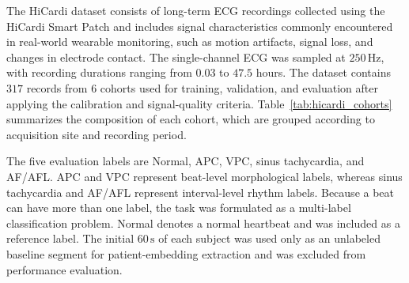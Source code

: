 \begin{table}[!ht]
\centering
\caption{Cohort composition of the HiCardi records.}
\label{tab:hicardi_cohorts}
\normalsize
\end{table}

The HiCardi dataset consists of long-term ECG recordings collected using the
HiCardi Smart Patch and includes signal characteristics commonly
encountered in real-world wearable monitoring, such as motion artifacts,
signal loss, and changes in electrode contact.
The single-channel ECG was sampled at $250\,\mathrm{Hz}$, with recording
durations ranging from $0.03$ to $47.5$ hours.
The dataset contains $317$ records from $6$ cohorts used for training, validation, and evaluation after applying the calibration and signal-quality criteria.
Table~\ref{tab:hicardi_cohorts} summarizes the composition of each cohort,
which are grouped according to acquisition site and recording period.

The five evaluation labels are Normal, APC, VPC, sinus tachycardia, and AF/AFL.
APC and VPC represent beat-level morphological labels, whereas sinus
tachycardia and AF/AFL represent interval-level rhythm labels.
Because a beat can have more than one label, the task was formulated as a
multi-label classification problem.
Normal denotes a normal heartbeat and was included as a reference label.
The initial $60\,\mathrm{s}$ of each subject was used only as an unlabeled
baseline segment for patient-embedding extraction and was excluded from
performance evaluation.

